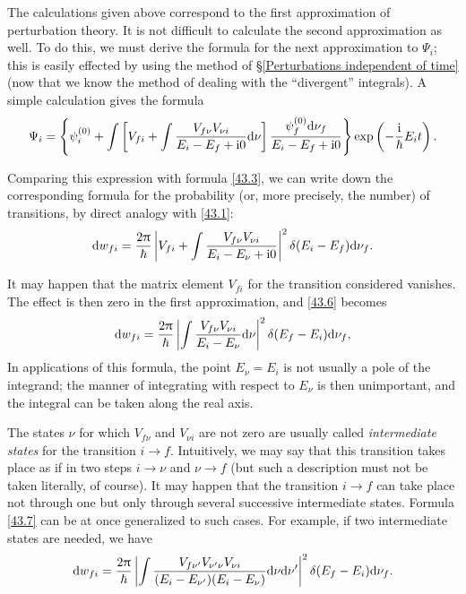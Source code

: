 The calculations given above correspond to the first approximation of perturbation theory. It is not difficult to calculate the second approximation as well. To do this, we must derive the formula for the next approximation to $ \Psi_i $; this is easily effected by using the method of \S\ref{Perturbations independent of time} (now that we know the method of dealing with the “divergent” integrals). A simple calculation gives the formula
\[ \Psi_i=\left\{\psi_i^{(0)}+\int\left[V_{fi}+\int\frac{V_{f\nu}V_{\nu i}}{E_i-E_f+\mathrm{i}0}\mathrm{d}\nu \right]\frac{\psi_f^{(0)}\mathrm{d}\nu_f}{E_i-E_f+\mathrm{i}0}  \right\}\exp\left(-\frac{\mathrm{i}}{\hbar}E_i t \right). \]



Comparing this expression with formula \eqref{43.3}, we can write down the corresponding formula for the probability (or, more precisely, the number) of transitions, by direct analogy with \eqref{43.1}:
\begin{equation}\label{43.6}
\mathrm{d} w_{fi}=\frac{2\uppi}{\hbar}\left|V_{fi}+\int\frac{V_{f\nu}V_{\nu i}}{E_i-E_\nu+\mathrm{i}0} \right|^2\delta(E_i-E_f)\mathrm{d}\nu_f.
\end{equation}



It may happen that the matrix element $ V_{fi} $ for the transition considered vanishes. The effect is then zero in the first approximation, and \eqref{43.6} becomes
\begin{equation}\label{43.7}
\mathrm{d} w_{fi}=\frac{2\uppi}{\hbar}\left|\int\frac{V_{f\nu}V_{\nu i}}{E_i-E_\nu}\mathrm{d}\nu \right|^2\delta(E_f-E_i)\mathrm{d}\nu_f,
\end{equation}
In applications of this formula, the point $ E_\nu = E_i $ is not usually a pole of the integrand; the manner of integrating with respect to $ E_\nu $ is then unimportant, and the integral can be taken along the real axis.

The states $\nu$ for which $ V_{f\nu} $ and $ V_{\nu i} $ are not zero are usually called \textit{intermediate states} for the transition $ i \to f $. Intuitively, we may say that this transition takes place as if in two steps $ i \to \nu $ and $ \nu\to  f $ (but such a description must not be taken literally, of course). It may happen that the transition $ i \to f $ can take place not through one but only through several successive intermediate states. Formula \eqref{43.7} can be at once generalized to such cases. For example, if two intermediate states are needed, we have
\begin{equation}\label{43.8}
\mathrm{d} w_{fi}=\frac{2\uppi}{\hbar}\left|\int\frac{V_{f\nu'}V_{\nu'\nu}V_{\nu i}}{(E_i-E_{\nu'})(E_i-E_\nu)}\mathrm{d}\nu\mathrm{d}\nu'\right|^2\delta(E_f-E_i)\mathrm{d}\nu_f.
\end{equation}



